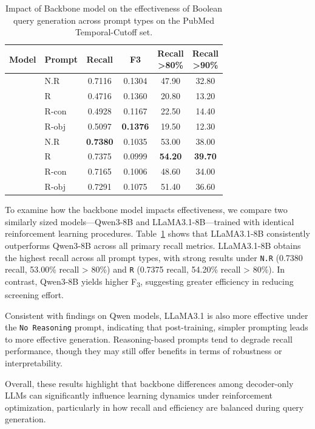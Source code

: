 \begin{table}[t]
	\centering
	\footnotesize
	\caption{Impact of Backbone model on the effectiveness of Boolean query generation across prompt types on the PubMed Temporal-Cutoff set.}
	\renewcommand{\arraystretch}{1.25}
	\label{tab:model_comparison}
		\begin{tabular*}{\columnwidth}{@{\extracolsep{\fill}}llcccc@{}}
			\toprule
			Model & Prompt & Recall & F3 & \parbox{2.5em}{Recall\\>80\%} & \parbox{2.5em}{Recall\\>90\%} \\
			\midrule
			 & N.R & 0.7116 & 0.1304 & 47.90 & 32.80 \\
			& R & 0.4716 & 0.1360 & 20.80 & 13.20 \\
			& R-con & 0.4928 & 0.1167 & 22.50 & 14.40 \\
			& R-obj & 0.5097 & \textbf{0.1376} & 19.50 & 12.30 \\
			\midrule
			 & N.R & \textbf{0.7380} & 0.1035 & 53.00 & 38.00 \\
			& R & 0.7375 & 0.0999 & \textbf{54.20} & \textbf{39.70} \\
			& R-con & 0.7165 & 0.1006 & 48.60 & 34.00 \\
			& R-obj & 0.7291 & 0.1075 & 51.40 & 36.60 \\
			\bottomrule
		\end{tabular*}%

\end{table}


To examine how the backbone model impacts effectiveness, we compare two similarly sized models—Qwen3-8B and LLaMA3.1-8B—trained with identical reinforcement learning procedures. Table~\ref{tab:model_comparison} shows that LLaMA3.1-8B consistently outperforms Qwen3-8B across all primary recall metrics.
LLaMA3.1-8B obtains the highest recall across all prompt types, with strong results under \texttt{N.R} (0.7380 recall, 53.00\% recall > 80\%) and \texttt{R} (0.7375 recall, 54.20\% recall > 80\%). In contrast, Qwen3-8B yields higher F\textsubscript{3}, suggesting greater efficiency in reducing screening effort.

Consistent with findings on Qwen models, LLaMA3.1 is also more effective under the \texttt{No Reasoning} prompt, indicating that post-training, simpler prompting leads to more effective generation. Reasoning-based prompts tend to degrade recall performance, though they may still offer benefits in terms of robustness or interpretability.

Overall, these results highlight that backbone differences among decoder-only LLMs can significantly influence learning dynamics under reinforcement optimization, particularly in how recall and efficiency are balanced during query generation.